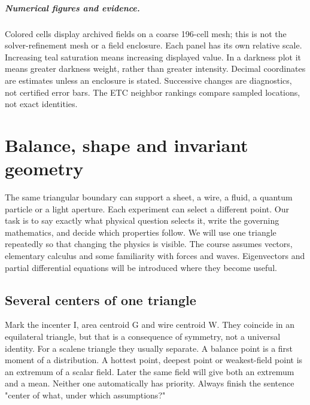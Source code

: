 \documentclass[11pt,oneside,openany]{book}
\begin{document}
\paragraph{Numerical figures and evidence.}
Colored cells display archived fields on a coarse 196-cell mesh; this is
not the solver-refinement mesh or a field enclosure. Each panel has its
own relative scale. Increasing teal saturation means increasing displayed
value. In a darkness plot it means greater darkness weight, rather than
greater intensity. Decimal coordinates are estimates unless an enclosure
is stated. Successive changes are diagnostics, not certified error bars.
The ETC neighbor rankings compare sampled locations, not exact identities.
\endgroup

\begingroup\small\tableofcontents\endgroup
\listoffigures\mainmatter

\chapter{Balance, shape and invariant geometry}\label{ch:1}

The same triangular boundary can support a sheet, a wire, a fluid, a quantum particle or a light aperture. Each experiment can select a different point. Our task is to say exactly what physical question selects it, write the governing mathematics, and decide which properties follow. We will use one triangle repeatedly so that changing the physics is visible. The course assumes vectors, elementary calculus and some familiarity with forces and waves. Eigenvectors and partial differential equations will be introduced where they become useful.


\section{Several centers of one triangle}\label{sec:slide2}

Mark the incenter I, area centroid G and wire centroid W. They coincide in an equilateral triangle, but that is a consequence of symmetry, not a universal identity. For a scalene triangle they usually separate. A balance point is a first moment of a distribution. A hottest point, deepest point or weakest-field point is an extremum of a scalar field. Later the same field will give both an extremum and a mean. Neither one automatically has priority. Always finish the sentence "center of what, under which assumptions?"
\end{document}
